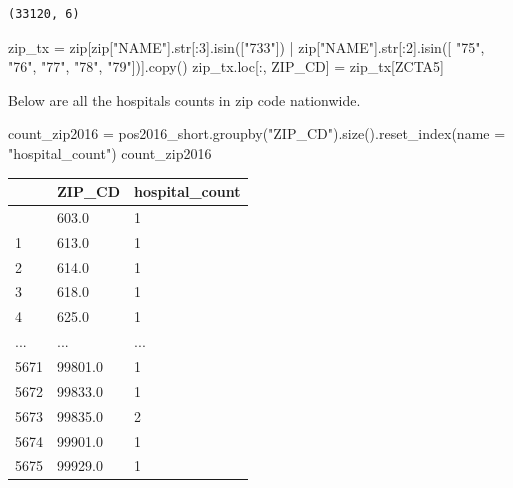 \documentclass[
  letterpaper,
  DIV=11,
  numbers=noendperiod]{scrartcl}
\newenvironment{Shaded}{\begin{snugshade}}{\end{snugshade}}
\newcommand{\BuiltInTok}[1]{\textcolor[rgb]{0.00,0.23,0.31}{#1}}
\newcommand{\DecValTok}[1]{\textcolor[rgb]{0.68,0.00,0.00}{#1}}
\newcommand{\NormalTok}[1]{\textcolor[rgb]{0.00,0.23,0.31}{#1}}
\newcommand{\OperatorTok}[1]{\textcolor[rgb]{0.37,0.37,0.37}{#1}}
\newcommand{\StringTok}[1]{\textcolor[rgb]{0.13,0.47,0.30}{#1}}
\begin{document}
\begin{verbatim}
(33120, 6)
\end{verbatim}

\begin{Shaded}
\begin{Highlighting}[]
\NormalTok{zip\_tx }\OperatorTok{=} \BuiltInTok{zip}\NormalTok{[}\BuiltInTok{zip}\NormalTok{[}\StringTok{"NAME"}\NormalTok{].}\BuiltInTok{str}\NormalTok{[:}\DecValTok{3}\NormalTok{].isin([}\StringTok{"733"}\NormalTok{]) }\OperatorTok{|} \BuiltInTok{zip}\NormalTok{[}\StringTok{"NAME"}\NormalTok{].}\BuiltInTok{str}\NormalTok{[:}\DecValTok{2}\NormalTok{].isin([}
    \StringTok{"75"}\NormalTok{, }\StringTok{"76"}\NormalTok{, }\StringTok{"77"}\NormalTok{, }\StringTok{"78"}\NormalTok{, }\StringTok{"79"}\NormalTok{])].copy()}
\NormalTok{zip\_tx.loc[:, }\StringTok{\textquotesingle{}ZIP\_CD\textquotesingle{}}\NormalTok{] }\OperatorTok{=}\NormalTok{ zip\_tx[}\StringTok{\textquotesingle{}ZCTA5\textquotesingle{}}\NormalTok{]}
\end{Highlighting}
\end{Shaded}

Below are all the hospitals counts in zip code nationwide.

\begin{Shaded}
\begin{Highlighting}[]
\NormalTok{count\_zip2016 }\OperatorTok{=}\NormalTok{ pos2016\_short.groupby(}\StringTok{"ZIP\_CD"}\NormalTok{).size().reset\_index(name }\OperatorTok{=} \StringTok{"hospital\_count"}\NormalTok{)}
\NormalTok{count\_zip2016}
\end{Highlighting}
\end{Shaded}

\begin{longtable}[]{@{}lll@{}}
\toprule\noalign{}
& ZIP\_CD & hospital\_count \\
\midrule\noalign{}
\endhead
\bottomrule\noalign{}
\endlastfoot
0 & 603.0 & 1 \\
1 & 613.0 & 1 \\
2 & 614.0 & 1 \\
3 & 618.0 & 1 \\
4 & 625.0 & 1 \\
... & ... & ... \\
5671 & 99801.0 & 1 \\
5672 & 99833.0 & 1 \\
5673 & 99835.0 & 2 \\
5674 & 99901.0 & 1 \\
5675 & 99929.0 & 1 \\
\end{longtable}
\end{document}
